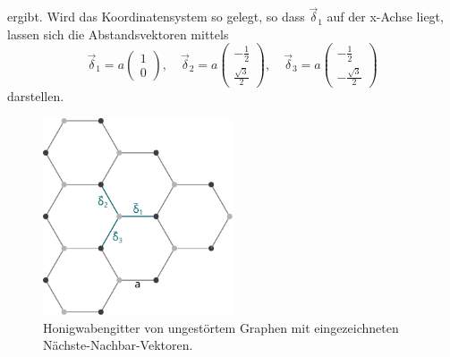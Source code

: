 ergibt.
Wird das Koordinatensystem so gelegt, so dass $\vec{\delta}_1$ auf der x-Achse liegt, lassen sich die Abstandsvektoren mittels 
\begin{equation*}
    \vec{\delta}_1 = a \begin{pmatrix} 1            \\[6pt] 0                   \end{pmatrix}, \quad
    \vec{\delta}_2 = a \begin{pmatrix} -\frac{1}{2} \\[6pt] \frac{\sqrt{3}}{2}  \end{pmatrix}, \quad 
    \vec{\delta}_3 = a \begin{pmatrix} -\frac{1}{2} \\[6pt] -\frac{\sqrt{3}}{2} \end{pmatrix}
\end{equation*}
darstellen.
\begin{figure}
    \centering
    \includegraphics[width = 0.5\textwidth]{Plots/graphene_lattice.pdf}
    \caption{Honigwabengitter von ungestörtem Graphen mit eingezeichneten Nächste-Nachbar-Vektoren.}
    \label{fig:graphene_lattice}
\end{figure}